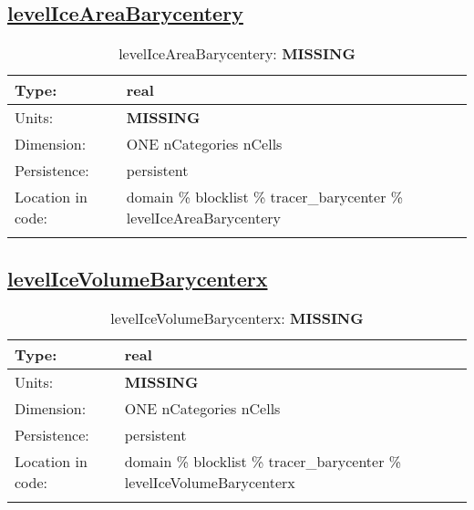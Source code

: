 \subsection[levelIceAreaBarycentery]{\hyperref[sec:var_tab_tracer_barycenter]{levelIceAreaBarycentery}}
\label{subsec:var_sec_tracer_barycenter_levelIceAreaBarycentery}
\begin{center}
\begin{longtable}{| p{2.0in} | p{4.0in} |}
        \hline 
        Type: & real \\
        \hline 
        Units: & {\bf \color{red} MISSING} \\
        \hline 
        Dimension: & ONE nCategories nCells \\
        \hline 
        Persistence: & persistent \\
        \hline 
         Location in code: & domain \% blocklist \% tracer\_barycenter \% levelIceAreaBarycentery \\
         \hline 
    \caption{levelIceAreaBarycentery: {\bf \color{red} MISSING}}
\end{longtable}
\end{center}
\subsection[levelIceVolumeBarycenterx]{\hyperref[sec:var_tab_tracer_barycenter]{levelIceVolumeBarycenterx}}
\label{subsec:var_sec_tracer_barycenter_levelIceVolumeBarycenterx}
\begin{center}
\begin{longtable}{| p{2.0in} | p{4.0in} |}
        \hline 
        Type: & real \\
        \hline 
        Units: & {\bf \color{red} MISSING} \\
        \hline 
        Dimension: & ONE nCategories nCells \\
        \hline 
        Persistence: & persistent \\
        \hline 
         Location in code: & domain \% blocklist \% tracer\_barycenter \% levelIceVolumeBarycenterx \\
         \hline 
    \caption{levelIceVolumeBarycenterx: {\bf \color{red} MISSING}}
\end{longtable}
\end{center}
